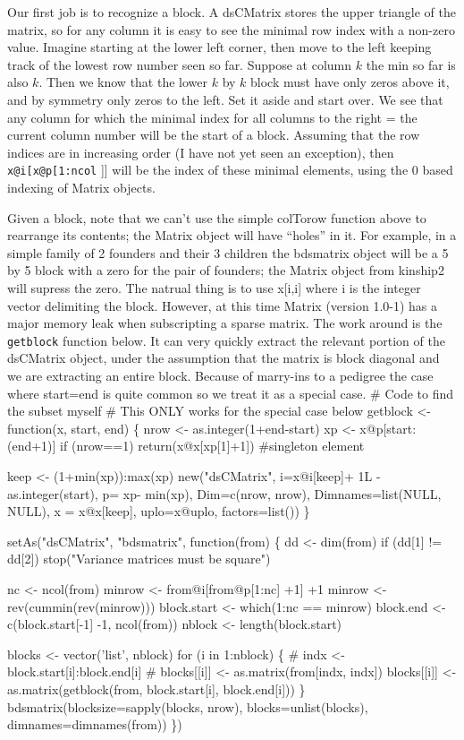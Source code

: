 \documentclass{article}
\begin{document}
Our first job is to recognize a block. 
A dsCMatrix stores the upper triangle of the matrix, so for
any column it is easy to see the minimal row index with a 
non-zero value.
Imagine starting at the lower left corner, then move to the
left keeping track of the lowest row number seen so far.
Suppose at column $k$ the min so far is also $k$.  Then we
know that the lower $k$ by $k$ block must have only zeros
above it, and by symmetry only zeros to the left.  Set it
aside and start over.  We see that
any column for which the minimal index for all columns to the
right = the current column number will be
the start of a block.
Assuming that the row indices are in increasing
order (I have not yet seen an exception),
then {\tt{}x@i[x@p[1:ncol} ]] will be the index of these minimal elements,
using the 0 based indexing of Matrix objects.

Given a block, note that we can't use the simple colTorow function     %
above to rearrange its contents; the Matrix object will have ``holes'' in it.
For example, in a simple family of 2 founders and their 3 children
the bdsmatrix object will be a 5 by 5 block with a zero for the
pair of founders; the Matrix object from kinship2 will supress the
zero.  
The natrual thing is to use x[i,i] where i is the integer vector
delimiting the block.  
However, at this time Matrix (version 1.0-1) has a major memory
leak when subscripting a sparse matrix.
The work around is the {\tt{}getblock} function below.
It can very quickly extract the relevant portion of the
dsCMatrix object, under the assumption that the matrix is block
diagonal and we are extracting an entire block.
Because of marry-ins to a pedigree the case where start=end is
quite common so we treat it as a special case.
\nwenddocs{}\plusendmoddef
# Code to find the subset myself
#  This ONLY works for the special case below
getblock <- function(x, start, end) \{
    nrow <-  as.integer(1+end-start)
    xp <- x@p[start:(end+1)]
    if (nrow==1) return(x@x[xp[1]+1])  #singleton element

    keep <- (1+min(xp)):max(xp)   
    new("dsCMatrix", i=x@i[keep]+ 1L - as.integer(start), 
        p= xp- min(xp), 
        Dim=c(nrow, nrow), Dimnames=list(NULL, NULL),
        x = x@x[keep], uplo=x@uplo, factors=list())
\}

setAs("dsCMatrix", "bdsmatrix", function(from) \{
    dd <- dim(from)
    if (dd[1] != dd[2]) stop("Variance matrices must be square")

    nc <- ncol(from)
    minrow <- from@i[from@p[1:nc] +1] +1
    minrow <- rev(cummin(rev(minrow)))
    block.start <- which(1:nc == minrow)
    block.end <- c(block.start[-1] -1, ncol(from))
    nblock <- length(block.start)
                     
    blocks <- vector('list', nblock)  
    for (i in 1:nblock) \{
#        indx <- block.start[i]:block.end[i]
#        blocks[[i]] <- as.matrix(from[indx, indx])
        blocks[[i]] <- as.matrix(getblock(from, block.start[i], block.end[i]))
    \}
    bdsmatrix(blocksize=sapply(blocks, nrow), blocks=unlist(blocks), 
              dimnames=dimnames(from))
    \})
\nwendcode{}\nwdocspar
\end{document}
